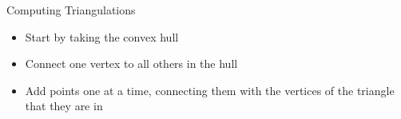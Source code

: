 \begin{frame}{Computing Triangulations}
	\begin{itemize}
		\item Start by taking the convex hull
		\item Connect one vertex to all others in the hull
		\item Add points one at a time, connecting them with the vertices of the triangle that they are in
	\end{itemize}
	
\end{frame}
